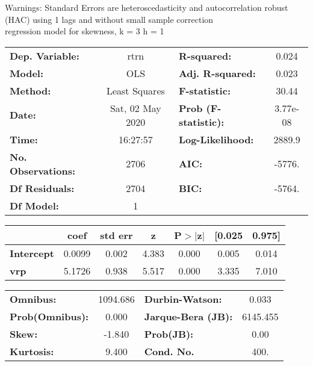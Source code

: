 Warnings: \newline
 [1] Standard Errors are heteroscedasticity and autocorrelation robust (HAC) using 1 lags and without small sample correction\\ 

regression model for skewness, k = 3 h = 1\begin{center}
\begin{tabular}{lclc}
\toprule
\textbf{Dep. Variable:}    &       rtrn       & \textbf{  R-squared:         } &     0.024   \\
\textbf{Model:}            &       OLS        & \textbf{  Adj. R-squared:    } &     0.023   \\
\textbf{Method:}           &  Least Squares   & \textbf{  F-statistic:       } &     30.44   \\
\textbf{Date:}             & Sat, 02 May 2020 & \textbf{  Prob (F-statistic):} &  3.77e-08   \\
\textbf{Time:}             &     16:27:57     & \textbf{  Log-Likelihood:    } &    2889.9   \\
\textbf{No. Observations:} &        2706      & \textbf{  AIC:               } &    -5776.   \\
\textbf{Df Residuals:}     &        2704      & \textbf{  BIC:               } &    -5764.   \\
\textbf{Df Model:}         &           1      & \textbf{                     } &             \\
\bottomrule
\end{tabular}
\begin{tabular}{lcccccc}
                   & \textbf{coef} & \textbf{std err} & \textbf{z} & \textbf{P$> |$z$|$} & \textbf{[0.025} & \textbf{0.975]}  \\
\midrule
\textbf{Intercept} &       0.0099  &        0.002     &     4.383  &         0.000        &        0.005    &        0.014     \\
\textbf{vrp}       &       5.1726  &        0.938     &     5.517  &         0.000        &        3.335    &        7.010     \\
\bottomrule
\end{tabular}
\begin{tabular}{lclc}
\textbf{Omnibus:}       & 1094.686 & \textbf{  Durbin-Watson:     } &    0.033  \\
\textbf{Prob(Omnibus):} &   0.000  & \textbf{  Jarque-Bera (JB):  } & 6145.455  \\
\textbf{Skew:}          &  -1.840  & \textbf{  Prob(JB):          } &     0.00  \\
\textbf{Kurtosis:}      &   9.400  & \textbf{  Cond. No.          } &     400.  \\
\bottomrule
\end{tabular}
\end{center}

